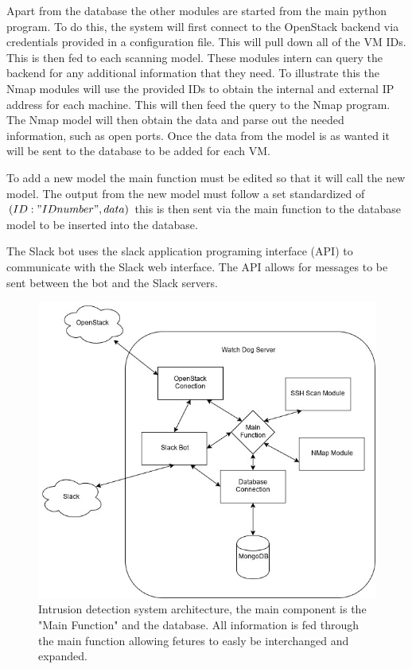 \documentclass[12pt]{article}
\begin{document}
Apart from the database the other modules are started from the main python program. To do this, the system will first connect to the OpenStack backend via credentials provided in a configuration file. This will pull down all of the VM IDs. This is then fed to each scanning model. These modules intern can query the backend for any additional information that they need. To illustrate this the Nmap modules will use the provided IDs to obtain the internal and external IP address for each machine. This will then feed the query to the Nmap program. The Nmap model will then obtain the data and parse out the needed information, such as open ports. Once the data from the model is as wanted it will be sent to the database to be added for each VM.

To add a new model the main function must be edited so that it will call the new model. The output from the new model must follow a set standardized of $(ID: "ID number", data)$ this is then sent via the main function to the database model to be inserted into the database.

The Slack bot uses the slack application programing interface (API) to communicate with the Slack web interface. The API allows for messages to be sent between the bot and the Slack servers.

\begin{figure}[ht]
    \includegraphics[scale=.5]{./pic/Arcitecture.png}
    \caption{Intrusion detection system architecture, the main component is the "Main Function" and the database. All information is fed through the main function allowing fetures to easly be interchanged and expanded.}
\end{figure}
\end{document}
